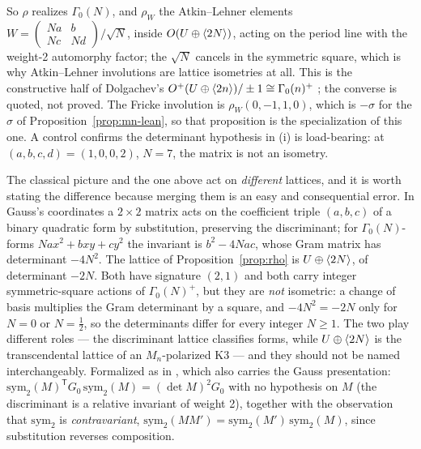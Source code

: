 So $\rho$ realizes $\Gamma_0(N)$, and $\rho_W$ the Atkin--Lehner elements
$W=\left(\begin{smallmatrix}Na&b\\Nc&Nd\end{smallmatrix}\right)/\sqrt N$, inside
$O(U\oplus\langle 2N\rangle)$, acting on the period line with the weight-2 automorphy
factor; the $\sqrt N$ cancels in the symmetric square, which is why
Atkin--Lehner involutions are lattice isometries at all. This is the
constructive half of Dolgachev's $O^{+}(U\oplus\langle 2n\rangle)/\pm1\cong\Gamma_0(n)^{+}$
\cite{Dolgachev1996}; the converse is quoted, not proved. The Fricke involution
is $\rho_W(0,-1,1,0)$, which is $-\sigma$ for the $\sigma$ of
Proposition~\ref{prop:mn-lean}, so that proposition is the specialization of this
one. A control confirms the determinant hypothesis in (i) is load-bearing: at
$(a,b,c,d)=(1,0,0,2)$, $N=7$, the matrix is not an isometry.

\begin{remark}\label{rem:two-lattices}
The classical picture and the one above act on \emph{different} lattices, and
it is worth stating the difference because merging them is an easy and
consequential error. In Gauss's coordinates a $2\times2$ matrix acts on the
coefficient triple $(a,b,c)$ of a binary quadratic form by substitution,
preserving the discriminant; for $\Gamma_0(N)$-forms $Na x^2+bxy+cy^2$ the
invariant is $b^2-4Nac$, whose Gram matrix has determinant $-4N^2$. The lattice
of Proposition~\ref{prop:rho} is $U\oplus\langle 2N\rangle$, of determinant $-2N$. Both
have signature $(2,1)$ and both carry integer symmetric-square actions of
$\Gamma_0(N)^{+}$, but they are \emph{not} isometric: a change of basis
multiplies the Gram determinant by a square, and $-4N^2=-2N$ only for $N=0$ or
$N=\tfrac12$, so the determinants differ for every integer $N\geq1$. The two
play different roles --- the discriminant lattice classifies forms, while
$U\oplus\langle 2N\rangle$ is the transcendental lattice of an $M_n$-polarized K3
\cite{Dolgachev1996} --- and they should not be named interchangeably.
Formalized as  in
, which also carries the Gauss
presentation: $\mathrm{sym}_2(M)^{\mathsf T}G_0\,\mathrm{sym}_2(M)=(\det M)^2G_0$
with no hypothesis on $M$ (the discriminant is a relative invariant of weight
2), together with the observation that $\mathrm{sym}_2$ is
\emph{contravariant}, $\mathrm{sym}_2(MM')=\mathrm{sym}_2(M')\,\mathrm{sym}_2(M)$,
since substitution reverses composition.
\end{remark}

